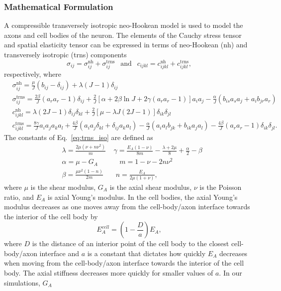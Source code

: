 \documentclass[10pt]{asme2ej}
\begin{document}
\subsubsection{Mathematical Formulation}
A compressible transversely isotropic neo-Hookean model is used to model \cite{Bonet:1998vc} the axons and cell bodies of the neuron. The elements of the Cauchy stress tensor and spatial elasticity tensor can be expressed in terms of neo-Hookean (nh) and transversely isotropic (trns) components \cite{Bonet:1998vc}
%
\begin{equation}
\sigma_{ij} = \sigma^{\text{nh}}_{ij} + \sigma^{\text{trns}}_{ij} \ \ \text{ and } \ \ c_{ijkl} = c^{\text{nh}}_{ijkl} + c^{\text{trns}}_{ijkl},
\end{equation}
%
respectively, where 
%
\begin{align}
&\sigma^{\text{nh}}_{ij} = \frac{\mu}{J}(b_{ij} - \delta_{ij}) + \lambda(J-1)\delta_{ij} \nonumber\\
%
&\sigma^{\text{trns}}_{ij} = \frac{2\beta}{J}(a_r a_r - 1)\delta_{ij} + \frac{2}{J}[\alpha+2\beta\ln J+2\gamma(a_r a_r -1)]a_i a_j - \frac{\alpha}{J}(b_{is}a_s a_j+a_i b_{jr}a_r) \nonumber\\
%
&c^{\text{nh}}_{ijkl} = \lambda(2J-1)\delta_{ij}\delta_{kl} + \frac{2}{J}[\mu - \lambda J(2J-1)]\delta_{ik}\delta_{jl} \nonumber\\
%
&c^{\text{trns}}_{ijkl} = \frac{8\gamma}{J}a_i a_j a_k a_l + \frac{4\beta}{J}(a_i a_j \delta_{kl} + \delta_{ij}a_k a_l) - \frac{\alpha}{J}(a_i a_l b_{jk} + b_{ik}a_j a_l) - \frac{4\beta}{J}(a_r a_r - 1)\delta_{ik}\delta_{jl}.
\label{eq:trns_iso}
\end{align}
%
The constants of Eq.\ \eqref{eq:trns_iso} are defined as
%
\begin{align}
&\lambda = \frac{2\mu (\nu+n\nu^2)}{m} \ \ \ \ \ \gamma = \frac{E_A(1-\nu)}{8m} - \frac{\lambda+2\mu}{8} + \frac{\alpha}{2} - \beta \nonumber\\
%
&\alpha = \mu - G_A \ \ \ \ \ \ \ \ \ \ \ \ \ \ m = 1 - \nu - 2 n\nu^2 \nonumber\\
%
&\beta = \frac{\mu \nu^2(1-n)}{2m} \ \ \ \ \ \ \ \ n = \frac{E_A}{2\mu(1+\nu)},
\label{eq:trns_iso_constants}
\end{align}
%
where $\mu$ is the shear modulus, $G_A$ is the axial shear modulus, $\nu$ is the Poisson ratio, and $E_A$ is axial Young's modulus. In the cell bodies, the axial Young's modulus decreases as one moves away from the cell-body/axon interface towards the interior of the cell body by 
%
\begin{equation}
E_A^{cell} = \left(1 - \frac{D}{a}\right)E_A,
\label{eq:cellEA}
\end{equation}
%
where $D$ is the distance of an interior point of the cell body to the closest cell-body/axon interface and $a$ is a constant that dictates how quickly $E_A$ decreases when moving from the cell-body/axon interface towards the interior of the cell body. The axial stiffness decreases more quickly for smaller values of $a$. In our simulations, $G_A$
\end{document}

